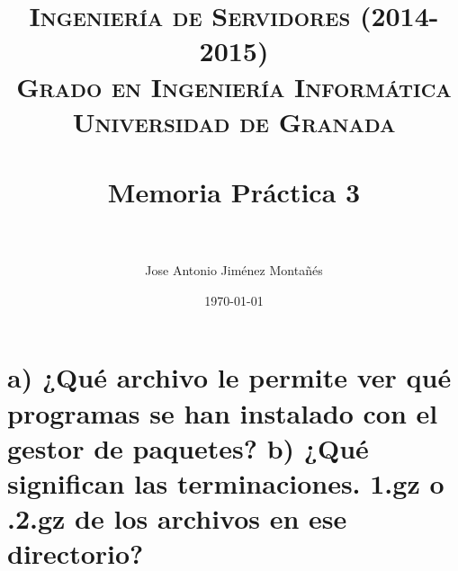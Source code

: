 

\usepackage[pdftex,colorlinks=true,linkcolor=negro,urlcolor=blue]{hyperref,xcolor}

\graphicspath{ {./imagenes/} }
\usepackage{subfig}
\hypersetup{citecolor=blue}

\title{	
\normalfont \normalsize 
\textsc{{\bf Ingeniería de Servidores (2014-2015)} \\ Grado en Ingeniería Informática \\ Universidad de Granada} \\ [25pt]
\horrule{0.5pt} \\[0.4cm] %
\huge Memoria Práctica 3 \\ %
\horrule{2pt} \\[0.5cm] %
}

\author{Jose Antonio Jiménez Montañés}

\date{\normalsize\today}

%






\maketitle %

\newpage %

\tableofcontents %
\clearpage
\listoffigures


\newpage


\section {a) ¿Qué archivo le permite ver qué programas se han instalado con el gestor de paquetes? b) ¿Qué significan las terminaciones. 1.gz o .2.gz de los archivos en ese directorio?}


